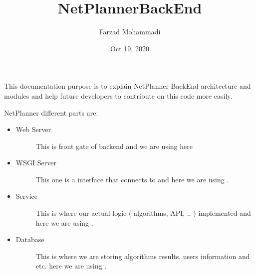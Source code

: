 \documentclass[letterpaper,10pt,english]{sphinxmanual}
\title{NetPlanner\sphinxhyphen{}BackEnd}
\date{Oct 19, 2020}
\author{Farzad Mohammadi}
\begin{document}
\pagestyle{empty}
\sphinxmaketitle
\pagestyle{plain}
\sphinxtableofcontents
\pagestyle{normal}
\label{\detokenize{index::doc}}


This documentation purpose is to explain NetPlanner BackEnd architecture and modules
and help future developers to contribute on this code more easily.

NetPlanner different parts are:
\begin{itemize}
\item {} \begin{description}
\item[{Web Server}] \leavevmode
This is front gate of backend and we are using  here

\end{description}

\item {} \begin{description}
\item[{WSGI Server}] \leavevmode
This one is a interface that connects  to 
and here we are using .

\end{description}

\item {} \begin{description}
\item[{Service}] \leavevmode
This is where our actual logic ( algorithms, API, .. ) implemented
and here we are using .

\end{description}

\item {} \begin{description}
\item[{Database}] \leavevmode
This is where we are storing algorithms results, users information and etc.
here we are using .

\end{description}

\end{itemize}
\end{document}
